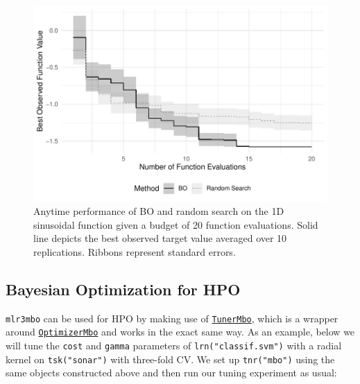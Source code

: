 \begin{figure}

{\centering \includegraphics[width=1\textwidth,height=\textheight]{chapters/chapter5/Figures/bo_1d_sinusoidal_bo_rs.pdf}

}

\caption{\label{fig-bayesian-sinusoidal_bo_rs}Anytime performance of BO
and random search on the 1D sinusoidal function given a budget of 20
function evaluations. Solid line depicts the best observed target value
averaged over 10 replications. Ribbons represent standard errors.}

\end{figure}

\hypertarget{sec-bayesian-tuning}{%
\subsection{Bayesian Optimization for HPO}\label{sec-bayesian-tuning}}

\texttt{mlr3mbo} can be used for HPO by making use of
\href{https://mlr3mbo.mlr-org.com/reference/mlr_tuners_mbo.html}{\texttt{TunerMbo}},
which is a wrapper around
\href{https://mlr3mbo.mlr-org.com/reference/mlr_optimizers_mbo.html}{\texttt{OptimizerMbo}}
and works in the exact same way. As an example, below we will tune the
\texttt{cost} and \texttt{gamma} parameters of
\texttt{lrn("classif.svm")} with a radial kernel on
\texttt{tsk("sonar")} with three-fold CV. We set up \texttt{tnr("mbo")}
using the same objects constructed above and then run our tuning
experiment as usual:

